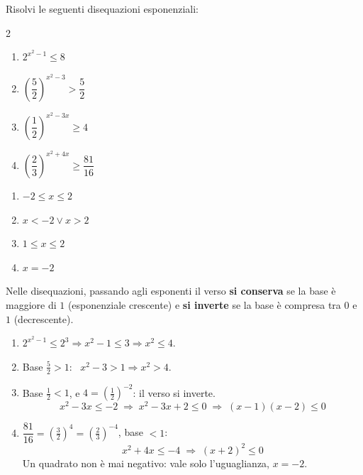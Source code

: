 \begin{question}[ID=5.4, subtitle={Disequazioni con esponente di secondo grado}, difficulty=difficile, tags={disequazioni, esponenziali, secondo grado}]
Risolvi le seguenti disequazioni esponenziali:
\begin{center}\begin{minipage}{0.92\linewidth}
\begin{multicols}{2}
\begin{enumerate}[leftmargin=3.2cm]
\item $2^{x^2-1} \leq 8$
\item $\left(\dfrac{5}{2}\right)^{x^2-3} > \dfrac{5}{2}$
\item $\left(\dfrac{1}{2}\right)^{x^2-3x} \geq 4$
\item $\left(\dfrac{2}{3}\right)^{x^2+4x} \geq \dfrac{81}{16}$
\end{enumerate}
\end{multicols}
\end{minipage}\end{center}
\begin{solution}
\begin{enumerate}
    \item $-2\leq x\leq2$
    \item $x<-2\vee x>2$
    \item $1\leq x\leq2$
    \item $x=-2$
\end{enumerate}
\end{solution}
\begin{explanation}
Nelle disequazioni, passando agli esponenti il verso \textbf{si conserva} se la base è maggiore di $1$ (esponenziale crescente) e \textbf{si inverte} se la base è compresa tra $0$ e $1$ (decrescente).
\begin{enumerate}
    \item $2^{x^2-1}\leq2^3 \Rightarrow x^2-1\leq3 \Rightarrow x^2\leq4$.
    \item Base $\tfrac52>1$: \ $x^2-3>1 \Rightarrow x^2>4$.
    \item Base $\tfrac12<1$, e $4=\left(\tfrac12\right)^{-2}$: il verso si inverte.
    \[ x^2-3x\leq-2 \;\Rightarrow\; x^2-3x+2\leq0 \;\Rightarrow\; (x-1)(x-2)\leq0 \]
    \item $\dfrac{81}{16}=\left(\tfrac32\right)^4=\left(\tfrac23\right)^{-4}$, base $<1$:
    \[ x^2+4x\leq-4 \;\Rightarrow\; (x+2)^2\leq0 \]
    Un quadrato non è mai negativo: vale solo l'uguaglianza, $x=-2$.
\end{enumerate}
\end{explanation}
\end{question}


